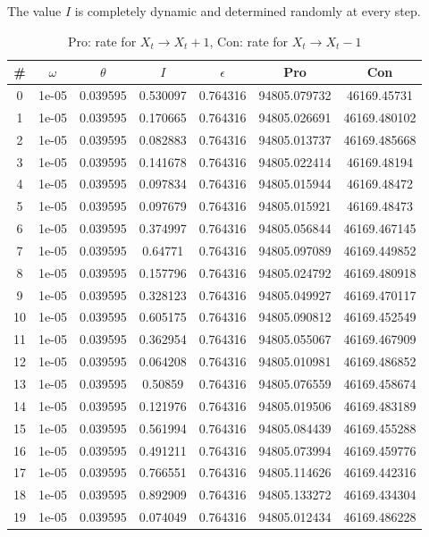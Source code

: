 The value $I$ is completely dynamic and determined randomly at every step.\begin{table}
\caption{Pro: rate for $X_t \rightarrow X_t + 1$, Con: rate for $X_t \rightarrow X_t - 1$}
\begin{tabular*}{\linewidth}{c|c|c|c|c|c|c}
\# & $\omega$ & $\theta$ & $I$ & $\epsilon$ & Pro & Con \\
\hline
0 & 1e-05 & 0.039595 & 0.530097 & 0.764316 & 94805.079732 & 46169.45731\\
1 & 1e-05 & 0.039595 & 0.170665 & 0.764316 & 94805.026691 & 46169.480102\\
2 & 1e-05 & 0.039595 & 0.082883 & 0.764316 & 94805.013737 & 46169.485668\\
3 & 1e-05 & 0.039595 & 0.141678 & 0.764316 & 94805.022414 & 46169.48194\\
4 & 1e-05 & 0.039595 & 0.097834 & 0.764316 & 94805.015944 & 46169.48472\\
5 & 1e-05 & 0.039595 & 0.097679 & 0.764316 & 94805.015921 & 46169.48473\\
6 & 1e-05 & 0.039595 & 0.374997 & 0.764316 & 94805.056844 & 46169.467145\\
7 & 1e-05 & 0.039595 & 0.64771 & 0.764316 & 94805.097089 & 46169.449852\\
8 & 1e-05 & 0.039595 & 0.157796 & 0.764316 & 94805.024792 & 46169.480918\\
9 & 1e-05 & 0.039595 & 0.328123 & 0.764316 & 94805.049927 & 46169.470117\\
10 & 1e-05 & 0.039595 & 0.605175 & 0.764316 & 94805.090812 & 46169.452549\\
11 & 1e-05 & 0.039595 & 0.362954 & 0.764316 & 94805.055067 & 46169.467909\\
12 & 1e-05 & 0.039595 & 0.064208 & 0.764316 & 94805.010981 & 46169.486852\\
13 & 1e-05 & 0.039595 & 0.50859 & 0.764316 & 94805.076559 & 46169.458674\\
14 & 1e-05 & 0.039595 & 0.121976 & 0.764316 & 94805.019506 & 46169.483189\\
15 & 1e-05 & 0.039595 & 0.561994 & 0.764316 & 94805.084439 & 46169.455288\\
16 & 1e-05 & 0.039595 & 0.491211 & 0.764316 & 94805.073994 & 46169.459776\\
17 & 1e-05 & 0.039595 & 0.766551 & 0.764316 & 94805.114626 & 46169.442316\\
18 & 1e-05 & 0.039595 & 0.892909 & 0.764316 & 94805.133272 & 46169.434304\\
19 & 1e-05 & 0.039595 & 0.074049 & 0.764316 & 94805.012434 & 46169.486228\\

\end{tabular*}
\end{table}
